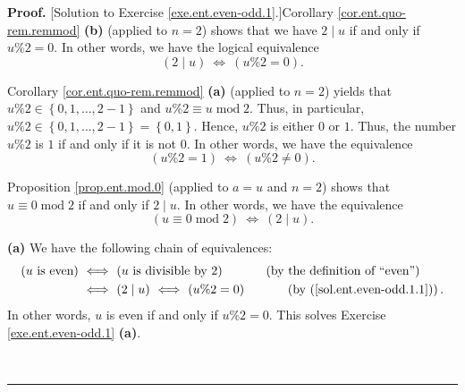 \documentclass[numbers=enddot,12pt,final,onecolumn,notitlepage]{scrartcl}%
\numberwithin{exer}{subsection}
\theoremstyle{definition}
\newenvironment{fineprint}{\begin{small}}{\end{small}}
\newenvironment{proof}[1][Proof]{\noindent\textbf{#1.} }{\ \rule{0.5em}{0.5em}}
\begin{document}
\begin{fineprint}
\begin{proof}
[Solution to Exercise \ref{exe.ent.even-odd.1}.]Corollary
\ref{cor.ent.quo-rem.remmod} \textbf{(b)} (applied to $n=2$) shows that we
have $2\mid u$ if and only if $u\%2=0$. In other words, we have the logical
equivalence
\begin{equation}
\left(  2\mid u\right)  \ \Longleftrightarrow\ \left(  u\%2=0\right)  .
\label{sol.ent.even-odd.1.1}%
\end{equation}


Corollary \ref{cor.ent.quo-rem.remmod} \textbf{(a)} (applied to $n=2$) yields
that $u\%2\in\left\{  0,1,\ldots,2-1\right\}  $ and $u\%2\equiv
u\operatorname{mod}2$. Thus, in particular, $u\%2\in\left\{  0,1,\ldots
,2-1\right\}  =\left\{  0,1\right\}  $. Hence, $u\%2$ is either $0$ or $1$.
Thus, the number $u\%2$ is $1$ if and only if it is not $0$. In other words,
we have the equivalence%
\begin{equation}
\left(  u\%2=1\right)  \ \Longleftrightarrow\ \left(  u\%2\neq0\right)  .
\label{sol.ent.even-odd.1.2}%
\end{equation}


Proposition \ref{prop.ent.mod.0} (applied to $a=u$ and $n=2$) shows that
$u\equiv0\operatorname{mod}2$ if and only if $2\mid u$. In other words, we
have the equivalence%
\begin{equation}
\left(  u\equiv0\operatorname{mod}2\right)  \ \Longleftrightarrow\ \left(
2\mid u\right)  . \label{sol.ent.even-odd.1.3}%
\end{equation}


\textbf{(a)} We have the following chain of equivalences:%
\begin{align*}
\left(  u\text{ is even}\right)  \  &  \Longleftrightarrow\ \left(  u\text{ is
divisible by }2\right)  \ \ \ \ \ \ \ \ \ \ \left(  \text{by the definition of
\textquotedblleft even\textquotedblright}\right) \\
&  \Longleftrightarrow\ \left(  2\mid u\right)  \ \Longleftrightarrow\ \left(
u\%2=0\right)  \ \ \ \ \ \ \ \ \ \ \left(  \text{by
(\ref{sol.ent.even-odd.1.1})}\right)  .
\end{align*}
In other words, $u$ is even if and only if $u\%2=0$. This solves Exercise
\ref{exe.ent.even-odd.1} \textbf{(a)}.


\end{proof}
\end{fineprint}
\end{document}
